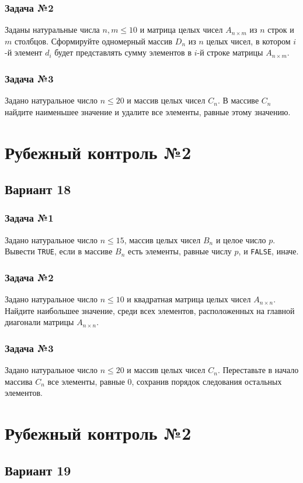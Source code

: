 \documentclass[12pt,a5paper,landscape]{report}
\begin{document}
\subsubsection*{Задача №2}
Заданы натуральные числа $n, m \le 10$ и матрица целых чисел $A_{n \times m}$ из $n$ строк и $m$ столбцов. Сформируйте одномерный массив $D_n$ из $n$ целых чисел, в котором $i$-й элемент $d_i$ будет представлять сумму элементов в $i$-й строке матрицы $A_{n \times m}$.
\subsubsection*{Задача №3}
Задано натуральное число $n \le 20$ и массив целых чисел $C_n$. В массиве $C_n$ найдите наименьшее значение и удалите все элементы, равные этому значению.


\clearpage
\section*{Рубежный контроль №2}
\subsection*{Вариант 18}
\subsubsection*{Задача №1}
Задано натуральное число $n \le 15$, массив целых чисел $B_n$ и целое число $p$. Вывести \texttt{TRUE}, если в массиве $B_n$ есть элементы, равные числу $p$, и \texttt{FALSE}, иначе.
\subsubsection*{Задача №2}
Задано натуральное число $n \le 10$ и квадратная матрица целых чисел $A_{n \times n}$. Найдите наибольшее значение, среди всех элементов, расположенных на главной диагонали матрицы $A_{n \times n}$.
\subsubsection*{Задача №3}
Задано натуральное число $n \le 20$ и массив целых чисел $C_n$. Переставьте в начало массива $C_n$ все элементы, равные $0$, сохранив порядок следования остальных элементов.


\clearpage
\section*{Рубежный контроль №2}
\subsection*{Вариант 19}
\end{document}
